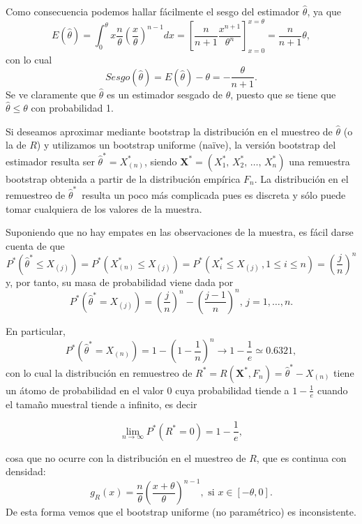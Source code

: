 \documentclass[
]{book}
\renewcommand{\mathbf}[1]{\symbf{#1}}
\theoremstyle{break}
\theoremstyle{nonumberplain}
\begin{document}
Como consecuencia podemos hallar fácilmente el sesgo del estimador
\(\hat{\theta}\), ya que
\[E\left( \hat{\theta} \right) =\int_{0}^{\theta }x\frac{n}{\theta }\left( 
\frac{x}{\theta } \right)^{n-1}dx=\left[ \frac{n}{n+1}\frac{x^{n+1}}{\theta
^{n}}\right] _{x=0}^{x=\theta }=\frac{n}{n+1}\theta ,\]
con lo cual
\[Sesgo\left( \hat{\theta} \right) =E\left( \hat{\theta} \right)
-\theta = -\frac{\theta }{n+1}.\]
Se ve claramente que \(\hat{\theta}\)
es un estimador sesgado de \(\theta\), puesto que se tiene que
\(\hat{\theta}\leq
\theta\) con probabilidad 1.

Si deseamos aproximar mediante bootstrap la distribución en el muestreo
de \(\hat{\theta}\) (o la de \(R\)) y utilizamos un bootstrap uniforme
(naïve), la versión bootstrap del estimador resulta ser
\(\hat{\theta}^{\ast
}=X_{(n)}^{\ast}\), siendo
\(\mathbf{X}^{\ast}=\left(
X_1^{\ast}\text{, }X_2^{\ast}\text{, }\ldots \text{, }X_n^{\ast
} \right)\) una remuestra bootstrap obtenida a partir de la distribución
empírica \(F_n\). La distribución en el remuestreo de \(\hat{\theta}
^{\ast}\,\) resulta un poco más complicada pues es discreta y sólo puede
tomar cualquiera de los valores de la muestra.

Suponiendo que no hay empates en las observaciones de la muestra, es
fácil darse cuenta de que
\[P^{\ast}\left( \hat{\theta}^{\ast}\leq X_{(j)} \right)
=P^{\ast}\left( X_{(n)}^{\ast}\leq X_{(j)
} \right) =P^{\ast}\left( X_i^{\ast}\leq X_{(j)}\,,
 1 \leq i \leq n \right) =\left( \frac{j}{n} \right)^{n}\]
y, por tanto, su masa de probabilidad viene dada por
\[P^{\ast}\left( \hat{\theta}^{\ast}=X_{(j)} \right) =\left( 
\frac{j}{n} \right)^{n}-\left( \frac{j-1}{n} \right)^{n}\text{, }j=1,\ldots,n.\]

En particular,
\[P^{\ast}\left( \hat{\theta}^{\ast}=X_{(n)} \right) =1-\left( 1-
\frac{1}{n} \right)^{n}\rightarrow 1-\frac{1}{e}\simeq 0.6321,\]
con lo cual la distribución en remuestreo de \(R^{\ast}=R\left(
\mathbf{X}^{\ast},F_n \right) =\hat{\theta}^{\ast}-X_{\left(
n \right)}\) tiene un átomo de probabilidad en el valor \(0\) cuya
probabilidad tiende a \(1-\frac{1}{e}\) cuando el tamaño muestral tiende a
infinito, es decir

\[\lim_{n\rightarrow \infty }P^{\ast}\left( R^{\ast}=0 \right) =1-\frac{1}{e},\]

cosa que no ocurre con la distribución en el muestreo de \(R\), que es continua
con densidad:
\[g_R\left( x \right) =\frac{n}{\theta }\left( \frac{x + \theta}{\theta } \right)^{n-1},
\text{ si }x\in \left[ -\theta, 0\right].\]
De esta forma vemos que el bootstrap uniforme (no paramétrico) es inconsistente.
\end{document}
